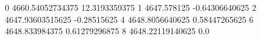 0 4660.54052734375 12.3193359375
1 4647.578125 -0.64306640625
2 4647.93603515625 -0.28515625
4 4648.8056640625 0.58447265625
6 4648.833984375 0.61279296875
8 4648.22119140625 0.0
